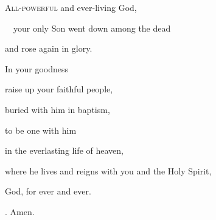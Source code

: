 \lettrine[loversize=0.15,lines=2]{A}{ll-powerful} and ever-living God,\par
~~your only Son went down among the dead\par
\noindent and rose again in glory.\par
\noindent In your goodness\par
\noindent raise up your faithful people,\par
\noindent buried with him in baptism,\par
\noindent to be one with him\par
\noindent in the everlasting life of heaven,\par
\noindent where he lives and reigns with you and the Holy Spirit,\par
\noindent God, for ever and ever. 
\par \noindent \Rbar. Amen.